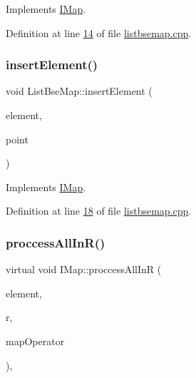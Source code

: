 Implements \hyperlink{a00165_a183f2d7ba8ec154d0338e999f195d0c8}{I\+Map}.



Definition at line \hyperlink{a00062_source_l00014}{14} of file \hyperlink{a00062_source}{listbsemap.\+cpp}.

\mbox{\label{a00169_a7aeae2bf692effb329f9a34604a6c286}} 
\subsubsection{\texorpdfstring{insert\+Element()}{insertElement()}}
{\footnotesize\ttfamily void List\+Bse\+Map\+::insert\+Element (\begin{DoxyParamCaption}\item[{\hyperlink{a00137}{I\+Base\+Game\+Element} $\ast$}]{element,  }\item[{Q\+Vector3D}]{point }\end{DoxyParamCaption})\hspace{0.3cm}{\ttfamily [virtual]}}



Implements \hyperlink{a00165_a2d44fb3d3798e08bebcd25ad5f1787f4}{I\+Map}.



Definition at line \hyperlink{a00062_source_l00018}{18} of file \hyperlink{a00062_source}{listbsemap.\+cpp}.

\mbox{\label{a00165_aa4feb51c5d024c99d4c57ccf5d2ff82d}} 
\subsubsection{\texorpdfstring{proccess\+All\+In\+R()}{proccessAllInR()}\hspace{0.1cm}{\footnotesize\ttfamily [1/2]}}
{\footnotesize\ttfamily virtual void I\+Map\+::proccess\+All\+InR (\begin{DoxyParamCaption}\item[{\hyperlink{a00137}{I\+Base\+Game\+Element} $\ast$}]{element,  }\item[{double}]{r,  }\item[{bool(\&)(\hyperlink{a00137}{I\+Base\+Game\+Element} $\ast$element)}]{map\+Operator }\end{DoxyParamCaption})\hspace{0.3cm}{\ttfamily [pure virtual]}, {\ttfamily [inherited]}}

